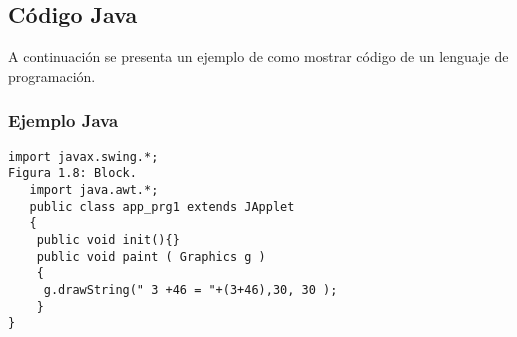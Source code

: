  \begin{frame}[fragile]
 \subsection{Código Java}

A continuación se presenta un ejemplo de como mostrar código de un lenguaje de programación.
 
  \frametitle{Ejemplo Java}
  \begin{verbatim}
import javax.swing.*;
Figura 1.8: Block.
   import java.awt.*;
   public class app_prg1 extends JApplet
   {
    public void init(){}
    public void paint ( Graphics g )
    {
     g.drawString(" 3 +46 = "+(3+46),30, 30 );
    }
}
\end{verbatim}
\end{frame}
